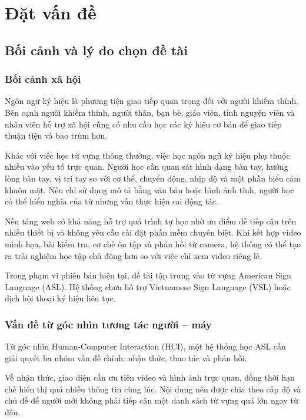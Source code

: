 \chapter{Đặt vấn đề}

\section{Bối cảnh và lý do chọn đề tài}

\subsection{Bối cảnh xã hội}

Ngôn ngữ ký hiệu là phương tiện giao tiếp quan trọng đối với người khiếm
thính. Bên cạnh người khiếm thính, người thân, bạn bè, giáo viên, tình nguyện
viên và nhân viên hỗ trợ xã hội cũng có nhu cầu học các ký hiệu cơ bản để giao
tiếp thuận tiện và bao trùm hơn.

Khác với việc học từ vựng thông thường, việc học ngôn ngữ ký hiệu phụ thuộc
nhiều vào yếu tố trực quan. Người học cần quan sát hình dạng bàn tay, hướng
lòng bàn tay, vị trí tay so với cơ thể, chuyển động, nhịp độ và một phần biểu
cảm khuôn mặt. Nếu chỉ sử dụng mô tả bằng văn bản hoặc hình ảnh tĩnh, người
học có thể hiểu nghĩa của từ nhưng vẫn thực hiện sai động tác.

Nền tảng web có khả năng hỗ trợ quá trình tự học nhờ ưu điểm dễ tiếp cận trên
nhiều thiết bị và không yêu cầu cài đặt phần mềm chuyên biệt. Khi kết hợp video
minh họa, bài kiểm tra, cơ chế ôn tập và phản hồi từ camera, hệ thống có thể tạo
ra trải nghiệm học tập chủ động hơn so với việc chỉ xem video riêng lẻ.

Trong phạm vi phiên bản hiện tại, đề tài tập trung vào từ vựng American Sign
Language (ASL). Hệ thống chưa hỗ trợ Vietnamese Sign Language (VSL) hoặc dịch
hội thoại ký hiệu liên tục.

\subsection{Vấn đề từ góc nhìn tương tác người -- máy}

Từ góc nhìn Human-Computer Interaction (HCI), một hệ thống học ASL cần giải
quyết ba nhóm vấn đề chính: nhận thức, thao tác và phản hồi.

Về nhận thức, giao diện cần ưu tiên video và hình ảnh trực quan, đồng thời hạn
chế hiển thị quá nhiều thông tin cùng lúc. Nội dung nên được chia theo cấp độ
và chủ đề để người mới không phải tiếp cận một danh sách từ vựng quá lớn ngay
từ đầu.

